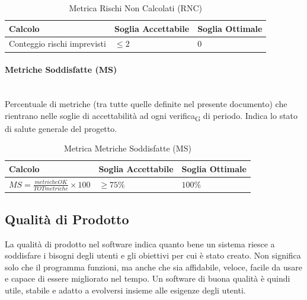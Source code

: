 \documentclass[11pt,a4paper]{article}
\newcommand{\gls}[1]{#1\textsubscript{G}}
\begin{document}
\begin{table}[H]
    \centering
    \renewcommand{\arraystretch}{1.5}
    \begin{tabular}{|M{0.4\textwidth}|M{0.25\textwidth}|M{0.25\textwidth}|}
        \hline
        \textbf{Calcolo} & \textbf{Soglia Accettabile} & \textbf{Soglia Ottimale} \\
        \hline
        Conteggio rischi imprevisti & $\le 2$ & $0$ \\
        \hline
    \end{tabular}
    \caption{Metrica Rischi Non Calcolati (RNC)}
\end{table}

\paragraph{Metriche Soddisfatte (MS)} \hfill \\
Percentuale di metriche (tra tutte quelle definite nel presente documento) che rientrano nelle soglie di accettabilità ad ogni \gls{verifica} di periodo. Indica lo stato di salute generale del progetto.

\begin{table}[H]
    \centering
    \renewcommand{\arraystretch}{1.5}
    \begin{tabular}{|M{0.4\textwidth}|M{0.25\textwidth}|M{0.25\textwidth}|}
        \hline
        \textbf{Calcolo} & \textbf{Soglia Accettabile} & \textbf{Soglia Ottimale} \\
        \hline
        $MS = \frac{metricheOK}{TOTmetriche} \times 100$ & $\ge 75\%$ & $100\%$ \\
        \hline
    \end{tabular}
    \caption{Metrica Metriche Soddisfatte (MS)}
\end{table}


\newpage
\subsection{Qualità di Prodotto}
La qualità di prodotto nel software indica quanto bene un sistema riesce a soddisfare i bisogni degli utenti e gli obiettivi per cui è stato creato. Non significa solo che il programma funzioni, ma anche che sia affidabile, veloce, facile da usare e capace di essere migliorato nel tempo. Un software di buona qualità è quindi utile, stabile e adatto a evolversi insieme alle esigenze degli utenti.
\end{document}
